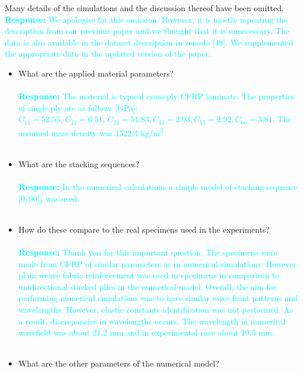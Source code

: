 \documentclass[11pt,a2paper]{report}
\begin{document}
	Many details of the simulations and the discussion thereof have been omitted. 
	\textcolor{Cyan}{
		\textbf{Response:}
	We apologise for this omission. However, it is mostly repeating the description from our previous paper and we thought that it is unnecessary. The data is also available in the dataset description in zenodo [48]. We supplemented the appropriate data in the updated version of the paper.}
	
	\begin{itemize}
		\item What are the applied material parameters?
			\\ \\
		\textcolor{Cyan}{
			\textbf{Response:}
		The material is typical cross-ply CFRP laminate. The properties of single ply are as follows [GPa]:
	    \(C_{11} = 52.55, \, C_{12} = 6.51, \, C_{22} = 51.83, C_{44} = 2.93, C_{55} = 2.92, C_{66} = 3.81\). The assumed mass density was 1522.4 kg/m\textsuperscript{3}}
		\\ \\
		\item What are the stacking sequences?
			\\ \\
		\textcolor{Cyan}{
			\textbf{Response:}
		In the numerical calculations a simple model of stacking sequence [0/90]\(_4\) was used.}
		\\ \\
		\item How do these compare to the real specimens used in the experiments?
			\\ \\
		\textcolor{Cyan}{
			\textbf{Response:}
		Thank you for this important question. The specimens were made from CFRP of similar parameters as in numerical simulations. However, plain weave fabric reinforcement was used in specimens in comparison to unidirectional stacked plies in the numerical model. Overall, the aim for performing numerical simulations was to have similar wave front patterns and wavelengths. However, elastic constants identification was not performed. As a result, discrepancies in wavelengths occurs. The wavelength in numerical wavefield was about 21.2 mm and in experimental case about 19.5 mm.}
		\\ \\
		\item What are the other parameters of the numerical model?
			\\ \\
		\textcolor{Cyan}{
}
\end{itemize}
\end{document}
